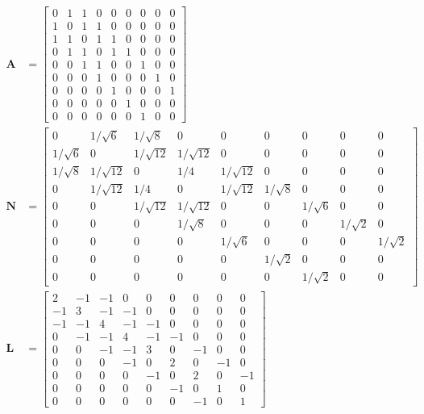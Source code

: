 \documentclass[11pt,a4paper]{book}
\begin{document}
\begin{align*}
  \mathbf A &= \left[ \begin{array}{ccccccccc} 
      0 & 1 & 1 & 0 & 0 & 0 & 0 & 0 & 0 \\
      1 & 0 & 1 & 1 & 0 & 0 & 0 & 0 & 0 \\
      1 & 1 & 0 & 1 & 1 & 0 & 0 & 0 & 0 \\
      0 & 1 & 1 & 0 & 1 & 1 & 0 & 0 & 0 \\
      0 & 0 & 1 & 1 & 0 & 0 & 1 & 0 & 0 \\
      0 & 0 & 0 & 1 & 0 & 0 & 0 & 1 & 0 \\
      0 & 0 & 0 & 0 & 1 & 0 & 0 & 0 & 1 \\
      0 & 0 & 0 & 0 & 0 & 1 & 0 & 0 & 0 \\
      0 & 0 & 0 & 0 & 0 & 0 & 1 & 0 & 0 
      \end{array}\right] 
\\
  \mathbf N &= \left[ \begin{array}{ccccccccc} 
      0 & 1/\sqrt 6 & 1/\sqrt 8 & 0 & 0 & 0 & 0 & 0 & 0 \\
      1/\sqrt 6 & 0 & 1/\sqrt{12} & 1/\sqrt{12} & 0 & 0 & 0 & 0 & 0 \\
      1/\sqrt 8 & 1/\sqrt{12} & 0 & 1/4 & 1/\sqrt{12} & 0 & 0 & 0 & 0 \\
      0 & 1/\sqrt{12} & 1/4 & 0 & 1/\sqrt{12} & 1/\sqrt 8 & 0 & 0 & 0 \\
      0 & 0 & 1/\sqrt{12} & 1/\sqrt{12} & 0 & 0 & 1/\sqrt 6 & 0 & 0 \\
      0 & 0 & 0 & 1/\sqrt 8 & 0 & 0 & 0 & 1/\sqrt 2 & 0 \\
      0 & 0 & 0 & 0 & 1/\sqrt 6 & 0 & 0 & 0 & 1/\sqrt 2 \\
      0 & 0 & 0 & 0 & 0 & 1/\sqrt 2 & 0 & 0 & 0 \\
      0 & 0 & 0 & 0 & 0 & 0 & 1/\sqrt 2 & 0 & 0 
      \end{array}\right] \\
  \mathbf L &= \left[ \begin{array}{ccccccccc} 
      2 & -1 & -1 & 0 & 0 & 0 & 0 & 0 & 0 \\
      -1 & 3 & -1 & -1 & 0 & 0 & 0 & 0 & 0 \\
      -1 & -1 & 4 & -1 & -1 & 0 & 0 & 0 & 0 \\
      0 & -1 & -1 & 4 & -1 & -1 & 0 & 0 & 0 \\
      0 & 0 & -1 & -1 & 3 & 0 & -1 & 0 & 0 \\
      0 & 0 & 0 & -1 & 0 & 2 & 0 & -1 & 0 \\
      0 & 0 & 0 & 0 & -1 & 0 & 2 & 0 & -1 \\
      0 & 0 & 0 & 0 & 0 & -1 & 0 & 1 & 0 \\
      0 & 0 & 0 & 0 & 0 & 0 & -1 & 0 & 1 
      \end{array}\right] 
\end{align*}
\end{document}
